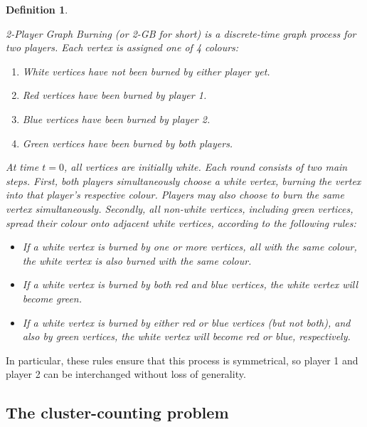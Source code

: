\documentclass{mpaper}
\newtheorem{definition}[theorem]{Definition}
\begin{document}
\begin{definition}
\label{def/2-GB}

2-Player Graph Burning (or 2-GB for short) is a discrete-time graph process for two players. Each vertex is assigned one of 4 colours:

\begin{enumerate}
  \item \emph{White} vertices have not been burned by either player yet.
  \item \emph{Red} vertices have been burned by player 1.
  \item \emph{Blue} vertices have been burned by player 2.
  \item \emph{Green} vertices have been burned by \emph{both} players.
\end{enumerate}

At time $t=0$, all vertices are initially white. Each round consists of two main steps. First, both players simultaneously choose a white vertex, burning the vertex into that player's respective colour. Players may also choose to burn the same vertex simultaneously. Secondly, all non-white vertices, including green vertices, spread their colour onto adjacent white vertices, according to the following rules:

\begin{itemize}
  \item If a white vertex is burned by one or more vertices, all with the same colour, the white vertex is also burned with the same colour.
  \item If a white vertex is burned by both red and blue vertices, the white vertex will become green.
  \item If a white vertex is burned by either red or blue vertices (but not both), and also by green vertices, the white vertex will become red or blue, respectively. 
\end{itemize}

\end{definition}

In particular, these rules ensure that this process is symmetrical, so player 1 and player 2 can be interchanged without loss of generality.

\subsection{The cluster-counting problem}
\vspace{1em}

\newcommand{\kcluster}{\textsc{kCluster  }}
\newcommand{\maxcluster}{\textsc{MaxCluster  }}
\end{document}
